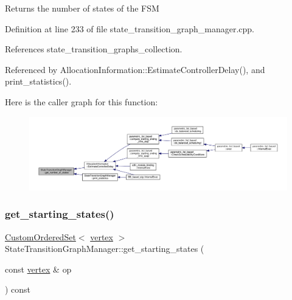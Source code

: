 \begin{DoxyReturn}{Returns}
the number of states of the F\+SM 
\end{DoxyReturn}


Definition at line 233 of file state\+\_\+transition\+\_\+graph\+\_\+manager.\+cpp.



References state\+\_\+transition\+\_\+graphs\+\_\+collection.



Referenced by Allocation\+Information\+::\+Estimate\+Controller\+Delay(), and print\+\_\+statistics().

Here is the caller graph for this function\+:
\nopagebreak
\begin{figure}[H]
\begin{center}
\leavevmode
\includegraphics[width=350pt]{d9/dfd/classStateTransitionGraphManager_a4ddb4b8f791ecffb4758dd4328b9f0fc_icgraph}
\end{center}
\end{figure}
\mbox{\label{classStateTransitionGraphManager_adf4d0d8cffd1c2055876aea1f74c45b8}} 
\subsubsection{\texorpdfstring{get\+\_\+starting\+\_\+states()}{get\_starting\_states()}}
{\footnotesize\ttfamily \hyperlink{classCustomOrderedSet}{Custom\+Ordered\+Set}$<$ \hyperlink{graph_8hpp_abefdcf0544e601805af44eca032cca14}{vertex} $>$ State\+Transition\+Graph\+Manager\+::get\+\_\+starting\+\_\+states (\begin{DoxyParamCaption}\item[{const \hyperlink{graph_8hpp_abefdcf0544e601805af44eca032cca14}{vertex} \&}]{op }\end{DoxyParamCaption}) const}



